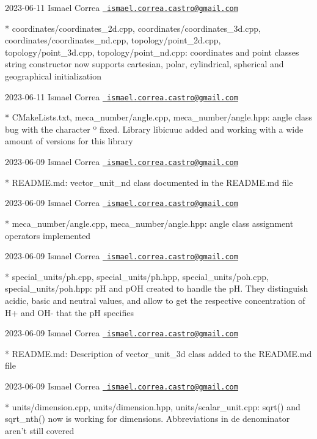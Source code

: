  2023-\/06-\/11 Ismael Correa \href{mailto:ismael.correa.castro@gmail.com}{\texttt{ ismael.\+correa.\+castro@gmail.\+com}} \begin{DoxyVerb}* coordinates/coordinates_2d.cpp, coordinates/coordinates_3d.cpp,
coordinates/coordinates_nd.cpp, topology/point_2d.cpp,
topology/point_3d.cpp, topology/point_nd.cpp: coordinates and point
classes string constructor now supports cartesian, polar,
cylindrical, spherical and geographical initialization
\end{DoxyVerb}
 2023-\/06-\/11 Ismael Correa \href{mailto:ismael.correa.castro@gmail.com}{\texttt{ ismael.\+correa.\+castro@gmail.\+com}} \begin{DoxyVerb}* CMakeLists.txt, meca_number/angle.cpp, meca_number/angle.hpp: 
angle class bug with the character º fixed. Library libicuuc added
and working with a wide amount of versions for this library
\end{DoxyVerb}
 2023-\/06-\/09 Ismael Correa \href{mailto:ismael.correa.castro@gmail.com}{\texttt{ ismael.\+correa.\+castro@gmail.\+com}} \begin{DoxyVerb}* README.md: vector_unit_nd class documented in the README.md file
\end{DoxyVerb}
 2023-\/06-\/09 Ismael Correa \href{mailto:ismael.correa.castro@gmail.com}{\texttt{ ismael.\+correa.\+castro@gmail.\+com}} \begin{DoxyVerb}* meca_number/angle.cpp, meca_number/angle.hpp: angle class
assignment operators implemented
\end{DoxyVerb}
 2023-\/06-\/09 Ismael Correa \href{mailto:ismael.correa.castro@gmail.com}{\texttt{ ismael.\+correa.\+castro@gmail.\+com}} \begin{DoxyVerb}* special_units/ph.cpp, special_units/ph.hpp,
special_units/poh.cpp, special_units/poh.hpp: pH and pOH created to
handle the pH. They distinguish acidic, basic and neutral values,
and allow to get the respective concentration of H+ and OH- that the
pH specifies
\end{DoxyVerb}
 2023-\/06-\/09 Ismael Correa \href{mailto:ismael.correa.castro@gmail.com}{\texttt{ ismael.\+correa.\+castro@gmail.\+com}} \begin{DoxyVerb}* README.md: Description of vector_unit_3d class added to the
README.md file
\end{DoxyVerb}
 2023-\/06-\/09 Ismael Correa \href{mailto:ismael.correa.castro@gmail.com}{\texttt{ ismael.\+correa.\+castro@gmail.\+com}} \begin{DoxyVerb}* units/dimension.cpp, units/dimension.hpp, units/scalar_unit.cpp: 
sqrt() and sqrt_nth() now is working for dimensions. Abbreviations
in de denominator aren't still covered
\end{DoxyVerb}
